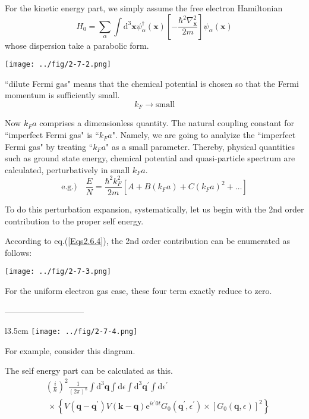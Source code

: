 For the kinetic energy part, we simply assume the free electron Hamiltonian
\[H_0 = \sum_\alpha \int \mathrm{d}^3 \mathbf{x} \psi_\alpha^\dagger (\mathbf{x}) \left[-\frac{\hbar^2\nabla^2_{\mathbf{x}}}{2m}\right]\psi_\alpha(\mathbf{x})\]
whose dispersion take a parabolic form.
\begin{center} \label{Fig2.7.2} \texttt{[image: ../fig/2-7-2.png]} \end{center}

``dilute Fermi gas" means that the chemical potential is chosen so that the Fermi momentum is sufficiently small. $$k_F \rightarrow \text{small}$$

Now $k_F a$ comprises a dimensionless quantity. The natural coupling constant for ``imperfect Fermi gas" is ``$k_F a$". Namely, we are going to analyize the ``imperfect Fermi gas" by treating ``$k_F a$" as a small parameter. Thereby, physical quantities such as ground state energy, chemical potential and quasi-particle spectrum are calculated, perturbatively in small $k_F a$.
\[ \text{e.g.)} \quad \frac{E}{N} = \frac{\hbar^2 k_F^2}{2m} \left[ A + B(k_F a) + C{(k_F a)}^2 + \ldots \right] \]

To do this perturbation expansion, systematically, let us begin with the 2nd order contribution to the proper self energy.

According to eq.(\ref{Eqs2.6.4}), the 2nd order contribution can be enumerated as follows:
\begin{center}\label{Fig2.7.3} \texttt{[image: ../fig/2-7-3.png]} \end{center}

For the uniform electron gas case, these four term exactly reduce to zero.
\begin{center}-----------------------------\end{center}

\begin{wrapfigure}{l}{3.5cm}
\label{Fig2.7.4} \texttt{[image: ../fig/2-7-4.png]}
\end{wrapfigure}
For example, consider this diagram.

The self energy part can be calculated as this.
\[ \begin{split} & {\left(\frac{i}{\hbar} \right)}^2 \frac{1}{\left( 2\pi \right)^8} \int \mathrm{d}^3 \mathbf{q} \int \mathrm{d}\epsilon \int \mathrm{d}^3 \mathbf{q}^{'} \int \mathrm{d} \epsilon^{'} \\
& \  \times \left\{ V(\mathbf{q}-\mathbf{q}^{'})V(\mathbf{k}-\mathbf{q})\mathrm{e}^{i \epsilon^{'} 0 t} G_0(\mathbf{q}^{'},\epsilon^{'}) \times \left[ G_0(\mathbf{q},\epsilon) \right]^2 \right \} \end{split} \]

